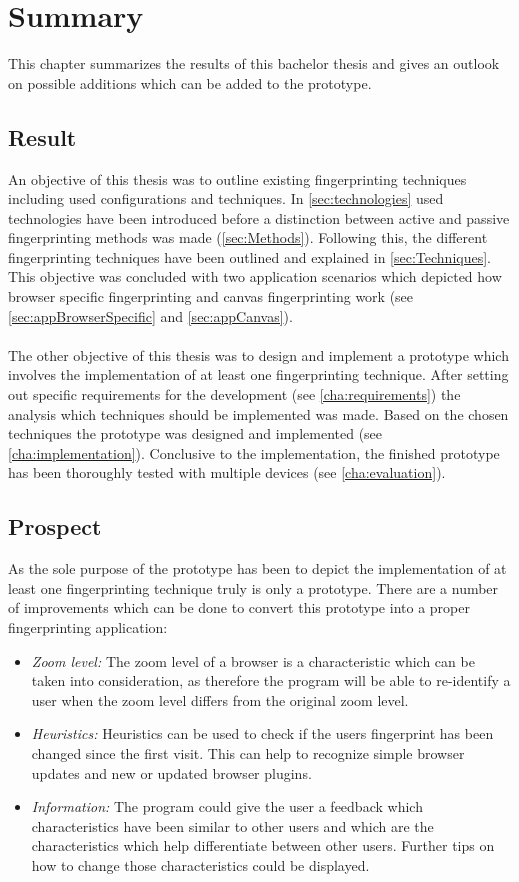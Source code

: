 \chapter{Summary}
\label{cha:summary}
This chapter summarizes the results of this bachelor thesis and gives an outlook on possible additions which can be added to the prototype.

\section{Result}
An objective of this thesis was to outline existing fingerprinting techniques including used configurations and techniques. In \autoref{sec:technologies} used technologies have been introduced before a distinction between active and passive fingerprinting methods was made (\autoref{sec:Methods}). Following this, the different fingerprinting techniques have been outlined and explained in \autoref{sec:Techniques}. This objective was concluded with two application scenarios which depicted how browser specific fingerprinting and canvas fingerprinting work (see \autoref{sec:appBrowserSpecific} and \autoref{sec:appCanvas}).\\\\
The other objective of this thesis was to design and implement a prototype which involves the implementation of at least one fingerprinting technique. After setting out specific requirements for the development (see \autoref{cha:requirements}) the analysis which techniques should be implemented was made. Based on the chosen techniques the prototype was designed and implemented (see \autoref{cha:implementation}). Conclusive to the implementation, the finished prototype has been thoroughly tested with multiple devices (see \autoref{cha:evaluation}).

\section{Prospect}
As the sole purpose of the prototype has been to depict the implementation of at least one fingerprinting technique truly is only a prototype. There are a number of improvements which can be done to convert this prototype into a proper fingerprinting application:\\

\begin{itemize}
	\item \textit{Zoom level: }The zoom level of a browser is a characteristic which can be taken into consideration, as therefore the program will be able to re-identify a user when the zoom level differs from the original zoom level.
	\item \textit{Heuristics: }Heuristics can be used to check if the users fingerprint has been changed since the first visit. This can help to recognize simple browser updates and new or updated browser plugins.
	\item \textit{Information: }The program could give the user a feedback which characteristics have been similar to other users and which are the characteristics which help differentiate between other users. Further tips on how to change those characteristics could be displayed.
\end{itemize} 


